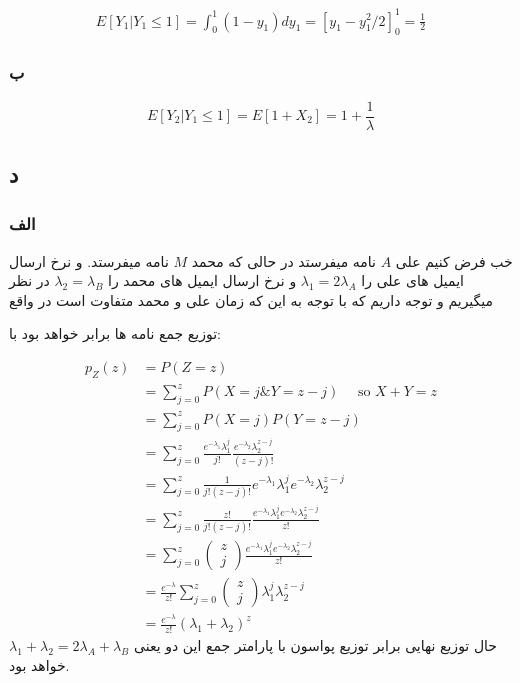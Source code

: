 \documentclass{article}[12pt]
\begin{document}
\begin{equation}
	\begin{gathered}
		E[ Y_{1} |Y_{1} \leqslant 1] =\int _{0}^{1}( 1-y_{1}) dy_{1} =\left[ y_{1} -y_{1}^{2} /2\right]_{0}^{1} =\frac{1}{2}
	\end{gathered}
\end{equation}

\subsubsection{ب}
\begin{equation}
	E[ Y_{2} |Y_{1} \leqslant 1] =E[ 1+X_{2}] =1+\frac{1}{\lambda }
\end{equation}

\subsection{د}
\subsubsection{الف}
خب فرض کنیم علی 
$A$
نامه میفرستد در حالی که محمد 
$M$
نامه میفرستد. و نرخ ارسال ایمیل های علی را 
$\lambda_1=2\lambda_A$
و نرخ ارسال ایمیل های محمد را 
$\lambda_2=\lambda_B$
در نظر میگیریم و توجه داریم که با توجه به این که زمان علی و محمد متفاوت است در واقع 

 توزیع جمع نامه ها برابر خواهد بود با:


\begin{equation}
	\begin{aligned}
		p_{Z}(z) &=P(Z=z) \\
		&=\sum_{j=0}^{z} P(X=j \& Y=z-j) \quad \text { so } X+Y=z \\
		&=\sum_{j=0}^{z} P(X=j) P(Y=z-j)  \\
		&=\sum_{j=0}^{z} \frac{e^{-\lambda_{1}} \lambda_{1}^{j}}{j !} \frac{e^{-\lambda_{2}} \lambda_{2}^{z-j}}{(z-j) !} \\
		&=\sum_{j=0}^{z} \frac{1}{j !(z-j) !} e^{-\lambda_{1}} \lambda_{1}^{j} e^{-\lambda_{2}} \lambda_{2}^{z-j} \\
		&=\sum_{j=0}^{z} \frac{z !}{j !(z-j) !} \frac{e^{-\lambda_{1}} \lambda_{1}^{j} e^{-\lambda_{2}} \lambda_{2}^{z-j}}{z !} \\
		&=\sum_{j=0}^{z}\left(\begin{array}{l}
			z \\
			j
		\end{array}\right) \frac{e^{-\lambda_{1}} \lambda_{1}^{j} e^{-\lambda_{2}} \lambda_{2}^{z-j}}{z !} \\
		&=\frac{e^{-\lambda}}{z !} \sum_{j=0}^{z}\left(\begin{array}{l}
			z \\
			j
		\end{array}\right) \lambda_{1}^{j} \lambda_{2}^{z-j} \\
		&=\frac{e^{-\lambda}}{z !}\left(\lambda_{1}+\lambda_{2}\right)^{z}
	\end{aligned}
\end{equation}
حال توزیع نهایی برابر توزیع پواسون با پارامتر جمع این دو یعنی 
$\lambda_1+\lambda_2 = 2\lambda_A+\lambda_B$
خواهد بود. 
\end{document}

